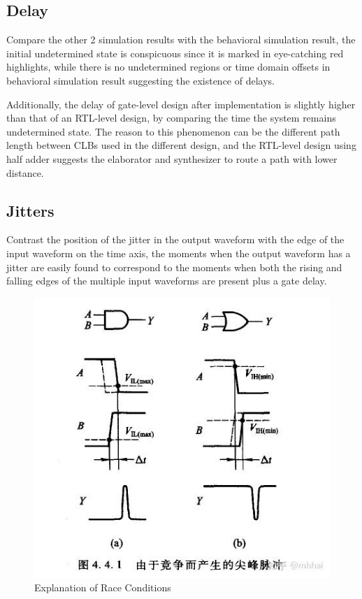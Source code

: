 \documentclass[conference]{IEEEtran}
\begin{document}
\subsection{Delay}

Compare the other 2 simulation results with the behavioral simulation result, the initial undetermined state is conspicuous since it is marked in eye-catching red highlights, while there is no undetermined regions or time domain offsets in behavioral simulation result suggesting the existence of delays.

Additionally, the delay of gate-level design after implementation is slightly higher than that of an RTL-level design, by comparing the time the system remains undetermined state. The reason to this phenomenon can be the different path length between CLBs used in the different design, and the RTL-level design using half adder suggests the elaborator and synthesizer to route a path with lower distance.

\subsection{Jitters}

Contrast the position of the jitter in the output waveform with the edge of the input waveform on the time axis, the moments when the output waveform has a jitter are easily found to correspond to the moments when both the rising and falling edges of the multiple input waveforms are present plus a gate delay.

\begin{figure}[htpb]
	\begin{center}
		\includegraphics[width=0.75\linewidth]{report_lab2.assets/20240308154213.png}
		\caption{Explanation of Race Conditions}
		\label{race_cond_explain}
	\end{center}
\end{figure}
\end{document}

